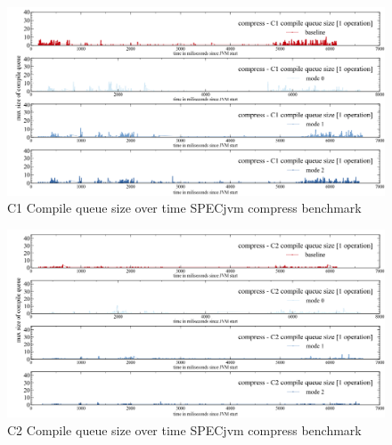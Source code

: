 \begin{figure}[ht]
  \begin{center}
    \centering
    \includegraphics[width=1.0\textwidth]{figures/spec_queue_compress_separate_c1.png}
    \caption{C1 Compile queue size over time SPECjvm compress benchmark}
    \label{f:spec_queue_compress_separate_c1}
  \end{center}
\end{figure}
\begin{figure}[ht]
  \begin{center}
    \centering
    \includegraphics[width=1.0\textwidth]{figures/spec_queue_compress_separate_c2.png}
    \caption{C2 Compile queue size over time SPECjvm compress benchmark}
    \label{f:spec_queue_compress_separate_c2}
  \end{center}
\end{figure}
